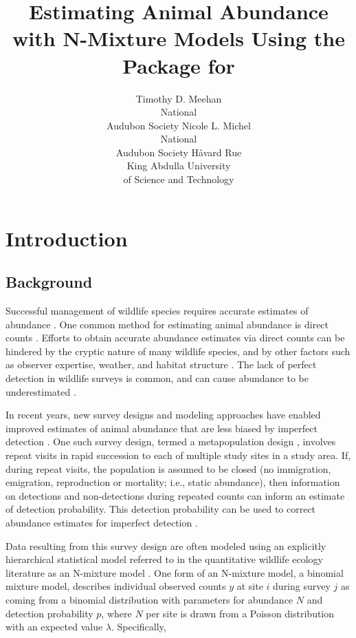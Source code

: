 \documentclass[codesnippet]{jss}
\author{Timothy D. Meehan\\National\\Audubon Society \And
	Nicole L. Michel\\National\\Audubon Society \And
	H{\aa}vard Rue\\King Abdulla University\\of Science and Technology}
\title{Estimating Animal Abundance with N-Mixture Models Using the 
\pkg{R-INLA} Package for \proglang{R}}
\begin{document}
	
\section[Introduction]{Introduction}
\subsection[Background]{Background}
Successful management of wildlife species requires accurate estimates of abundance  \citep{Yoccoz_Nichols_Boulinier_2001}. One common method for estimating animal abundance is direct counts  \citep{Pollock_Nichols_Simons_Farnsworth_Bailey_Sauer_2002}. Efforts to obtain accurate abundance estimates via direct counts can be hindered by the cryptic nature of many wildlife species, and by other factors such as observer expertise, weather, and habitat structure  \citep{Denes_Silveira_Beissinger_2015}. The lack of perfect detection in wildlife surveys is common, and can cause abundance to be underestimated  \citep{Wenger_Freeman_2008, Joseph_Elkin_Martin_Possingham_2009}.

In recent years, new survey designs and modeling approaches have enabled improved estimates of animal abundance that are less biased by imperfect detection \citep{Denes_Silveira_Beissinger_2015}. One such survey design, termed a metapopulation design \citep{Kery_Royle_2010}, involves repeat visits in rapid succession to each of multiple study sites in a study area. If, during repeat visits, the population is assumed to be closed (no immigration, emigration, reproduction or mortality; i.e., static abundance), then information on detections and non-detections during repeated counts can inform an estimate of detection probability. This detection probability can be used to correct abundance estimates for imperfect detection \citep{Royle_2004}.

Data resulting from this survey design are often modeled using an explicitly 
hierarchical statistical model referred to in the quantitative wildlife 
ecology literature as an N-mixture model  
\citep{Royle_Nichols_2003, Dodd_Dorazio_2004, Royle_2004, 
Kery_Royle_Schmid_2005}. One form of an N-mixture model, a binomial mixture 
model, describes individual observed counts $y$ at site $i$ during survey 
$j$ as coming from a binomial distribution with parameters for abundance $N$ 
and detection probability $p$, where $N$ per site is drawn from a Poisson 
distribution with an expected value $\lambda$. Specifically,
\end{document}
